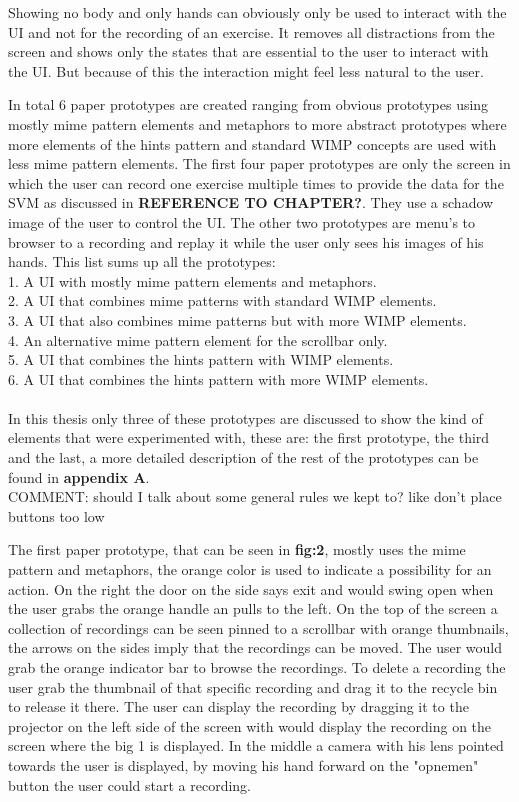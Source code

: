  Showing no body and only hands can obviously only be used to interact with the UI and not for the recording of an exercise. It removes all distractions from the screen and shows only the states that are essential to the user to interact with the UI. But because of this the interaction might feel less natural to the user.
 
In total 6 paper prototypes are created ranging from obvious prototypes using mostly mime pattern elements and metaphors to more abstract prototypes where more elements of the hints pattern and standard WIMP concepts are used with less mime pattern elements. 
The first four paper prototypes are only the screen in which the user can record one exercise multiple times to provide the data for the SVM as discussed in \textbf{REFERENCE TO CHAPTER?}. They use a schadow image of the user to control the UI. The other two prototypes are menu's to browser to a recording and replay it while the user only sees his images of his hands. This list sums up all the prototypes: \\

1. A UI with mostly mime pattern elements and metaphors. \\
2. A UI that combines mime patterns with standard WIMP elements. \\
3. A UI that also combines mime patterns but with more WIMP elements. \\
4. An alternative mime pattern element for the scrollbar only. \\
5. A UI that combines the hints pattern with WIMP elements. \\
6. A UI that combines the hints pattern with more WIMP elements.\\ \\

In this thesis only three of these prototypes are discussed to show the kind of elements that were experimented with, these are: the first prototype, the third and the last, a more detailed description of the rest of the prototypes can be found in \textbf{appendix A}.\\

{\large COMMENT: should I talk about some general rules we kept to? like don't place buttons too low}

The first paper prototype, that can be seen in \textbf{ fig:2}, mostly uses the mime pattern and metaphors, the orange color is used to indicate a possibility for an action. On the right the door on the side says exit and would swing open when the user grabs the orange handle an pulls to the left. On the top of the screen a collection of recordings can be seen pinned to a scrollbar with orange thumbnails, the arrows on the sides imply that the recordings can be moved. The user would grab the orange indicator bar to browse the recordings. To delete a recording the user grab the thumbnail of that specific recording and drag it to the recycle bin to release it there. The user can display the recording by dragging it to the projector on the left side of the screen with would display the recording on the screen where the big 1 is displayed. In the middle a camera with his lens pointed towards the user is displayed, by moving his hand forward on the "opnemen" button the user could start a recording.

